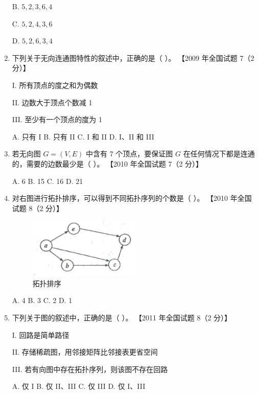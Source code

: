 \documentclass[lang=cn,newtx,10pt,scheme=chinese]{../../elegantbook}
\begin{document}
\begin{enumerate}
        B. $5, 2, 3, 6, 4$  

        C. $5, 2, 4, 3, 6$  

        D. $5, 2, 6, 3, 4$  


        \item 下列关于无向连通图特性的叙述中，正确的是（ ）。  
        【2009 年全国试题 7（2 分）】 

        I. 所有顶点的度之和为偶数  

        II. 边数大于顶点个数减 1  

        III. 至少有一个顶点的度为 1  

        A. 只有 I \quad B. 只有 II \quad C. I 和 II \quad D. I、II 和 III  
    
        \item 若无向图 $G = (V, E)$ 中含有 7 个顶点，要保证图 $G$ 在任何情况下都是连通的，需要的边数最少是（ ）。  
        【2010 年全国试题 7（2 分）】  

        A. 6 \quad B. 15 \quad C. 16 \quad D. 21  
    
        \item 对右图进行拓扑排序，可以得到不同拓扑序列的个数是（ ）。  
        【2010 年全国试题 8（2 分）】  

        \begin{figure}[h!]
            \centering
            \includegraphics[width=0.5\textwidth]{../../figure/exercisePicPDF/chapter7/7-10.pdf}
            \caption{拓扑排序}
        \end{figure}

        A. 4 \quad B. 3 \quad C. 2 \quad D. 1  
    
        \item 下列关于图的叙述中，正确的是（ ）。  
        【2011 年全国试题 8（2 分）】  

        I. 回路是简单路径  

        II. 存储稀疏图，用邻接矩阵比邻接表更省空间  

        III. 若有向图中存在拓扑序列，则该图不存在回路  

        A. 仅 I \quad B. 仅 II、III \quad C. 仅 III \quad D. 仅 I、III  
    

\end{enumerate}
\end{document}
